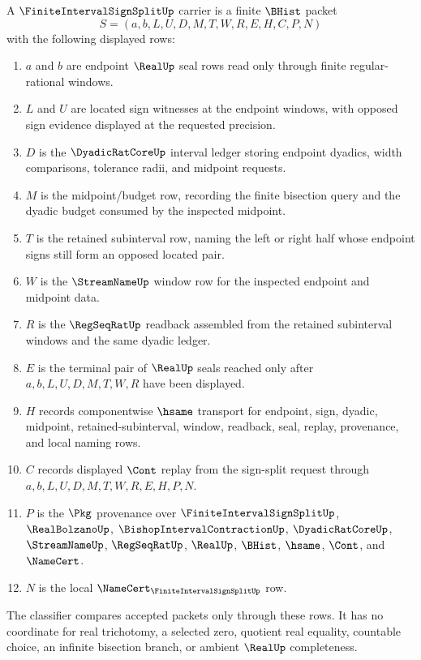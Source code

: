 \begin{definition}
\label{def:finite-interval-sign-split-carrier}
A $\FiniteIntervalSignSplitUp$ carrier is a finite $\BHist$ packet
$$
S=(a,b,L,U,D,M,T,W,R,E,H,C,P,N)
$$
with the following displayed rows:
\begin{enumerate}
\item $a$ and $b$ are endpoint $\RealUp$ seal rows read only through finite regular-rational windows.
\item $L$ and $U$ are located sign witnesses at the endpoint windows, with opposed sign evidence displayed at the requested precision.
\item $D$ is the $\DyadicRatCoreUp$ interval ledger storing endpoint dyadics, width comparisons, tolerance radii, and midpoint requests.
\item $M$ is the midpoint/budget row, recording the finite bisection query and the dyadic budget consumed by the inspected midpoint.
\item $T$ is the retained subinterval row, naming the left or right half whose endpoint signs still form an opposed located pair.
\item $W$ is the $\StreamNameUp$ window row for the inspected endpoint and midpoint data.
\item $R$ is the $\RegSeqRatUp$ readback assembled from the retained subinterval windows and the same dyadic ledger.
\item $E$ is the terminal pair of $\RealUp$ seals reached only after $a,b,L,U,D,M,T,W,R$ have been displayed.
\item $H$ records componentwise $\hsame$ transport for endpoint, sign, dyadic, midpoint, retained-subinterval, window, readback, seal, replay, provenance, and local naming rows.
\item $C$ records displayed $\Cont$ replay from the sign-split request through $a,b,L,U,D,M,T,W,R,E,H,P,N$.
\item $P$ is the $\Pkg$ provenance over $\FiniteIntervalSignSplitUp$, $\RealBolzanoUp$, $\BishopIntervalContractionUp$, $\DyadicRatCoreUp$, $\StreamNameUp$, $\RegSeqRatUp$, $\RealUp$, $\BHist$, $\hsame$, $\Cont$, and $\NameCert$.
\item $N$ is the local $\NameCert_{\FiniteIntervalSignSplitUp}$ row.
\end{enumerate}
The classifier compares accepted packets only through these rows. It has no coordinate for real trichotomy, a selected zero, quotient real equality, countable choice, an infinite bisection branch, or ambient $\RealUp$ completeness.
\end{definition}

